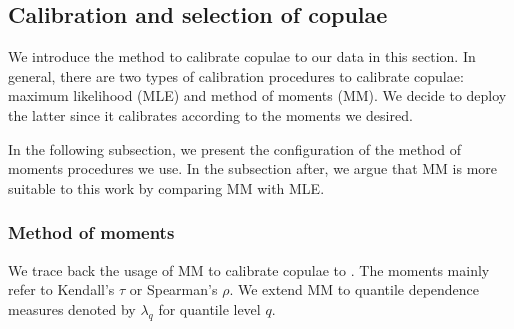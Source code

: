 
\subsection{Calibration and selection of copulae}\label{sec:estimation}
We introduce the method to calibrate copulae to our data in this section.
In general, there are two types of calibration procedures to calibrate copulae:
maximum likelihood (MLE) and method of moments (MM).
We decide to deploy the latter since it calibrates according to the moments we desired. \medskip

In the following subsection, we present the configuration of the method of moments procedures we use.
In the subsection after, we argue that MM is more suitable to this work by comparing MM with MLE.

\subsubsection{Method of moments}
\label{subsec:simulated-method-of-moments}

We trace back the usage of MM to calibrate copulae to \citet{Genest1987, genest1993statistical}.
The moments mainly refer to Kendall's $\tau$ or Spearman's $\rho$.
We extend MM to quantile dependence measures denoted by $\lambda_q$ for quantile level $q$.


